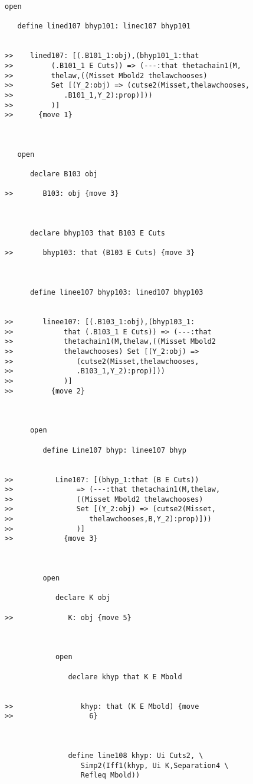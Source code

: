 \documentclass[12pt]{article}
\begin{document}
\begin{verbatim}
open

   define lined107 bhyp101: linec107 bhyp101


>>    lined107: [(.B101_1:obj),(bhyp101_1:that
>>         (.B101_1 E Cuts)) => (---:that thetachain1(M,
>>         thelaw,((Misset Mbold2 thelawchooses)
>>         Set [(Y_2:obj) => (cutse2(Misset,thelawchooses,
>>            .B101_1,Y_2):prop)]))
>>         )]
>>      {move 1}



   open

      declare B103 obj

>>       B103: obj {move 3}



      declare bhyp103 that B103 E Cuts

>>       bhyp103: that (B103 E Cuts) {move 3}



      define linee107 bhyp103: lined107 bhyp103


>>       linee107: [(.B103_1:obj),(bhyp103_1:
>>            that (.B103_1 E Cuts)) => (---:that
>>            thetachain1(M,thelaw,((Misset Mbold2
>>            thelawchooses) Set [(Y_2:obj) =>
>>               (cutse2(Misset,thelawchooses,
>>               .B103_1,Y_2):prop)]))
>>            )]
>>         {move 2}



      open

         define Line107 bhyp: linee107 bhyp


>>          Line107: [(bhyp_1:that (B E Cuts))
>>               => (---:that thetachain1(M,thelaw,
>>               ((Misset Mbold2 thelawchooses)
>>               Set [(Y_2:obj) => (cutse2(Misset,
>>                  thelawchooses,B,Y_2):prop)]))
>>               )]
>>            {move 3}



         open

            declare K obj

>>             K: obj {move 5}



            open

               declare khyp that K E Mbold


>>                khyp: that (K E Mbold) {move
>>                  6}



               define line108 khyp: Ui Cuts2, \
                  Simp2(Iff1(khyp, Ui K,Separation4 \
                  Refleq Mbold))


\end{verbatim}
\end{document}
